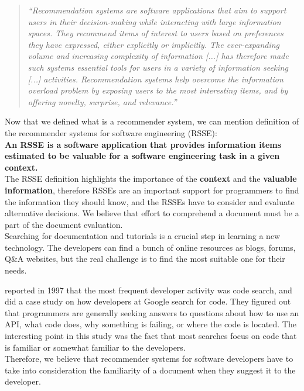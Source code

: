 \documentclass[12pt,mscthesis]{usiinfthesis}
\begin{document}
	  \blockquote{\textit{``Recommendation systems are software applications that aim to support users in their decision-making while interacting with large information spaces. They recommend items of interest to users based on preferences they have expressed, either explicitly or implicitly. The ever-expanding volume and increasing complexity of information [...] has therefore made such systems essential tools for users in a variety of information seeking [...] activities. Recommendation systems help overcome the information overload problem by exposing users to the most interesting items, and by offering novelty, surprise, and relevance.''}}
	Now that we defined what is a recommender system, we can mention \citet{RecommendationSystemsforSoftwareEngineering} definition of the recommender systems for software engineering (RSSE):\\

	\textbf{An RSSE is a software application that provides information items estimated to be valuable for a software engineering task in a given context.}\\

	The RSSE definition highlights the importance of the \textbf{context} and the \textbf{valuable information}, therefore RSSEs are an important support for programmers to find the information they should know, and the RSSEs have to consider and evaluate alternative decisions. We believe that effort to comprehend a document must be a part of the document evaluation.\\


	Searching for documentation and tutorials is a crucial step in learning a new technology. The developers can find a bunch of online resources as blogs, forums, Q\&A websites, but the real challenge is to find the most suitable one for their needs.



	\citet{Singer-1997} reported in 1997 that the most frequent developer activity was code search, and \citet{Sadowski:2015} did a case study on how developers at Google search for code. They figured out that programmers are generally seeking answers to questions about how to use an API, what code does, why something is failing, or where the code is located. The interesting point in this study was the fact that most searches focus on code that is familiar or somewhat familiar to the developers.\\
	Therefore, we believe that recommender systems for software developers have to take into consideration the familiarity of a document when they suggest it to the developer. 
\end{document}
